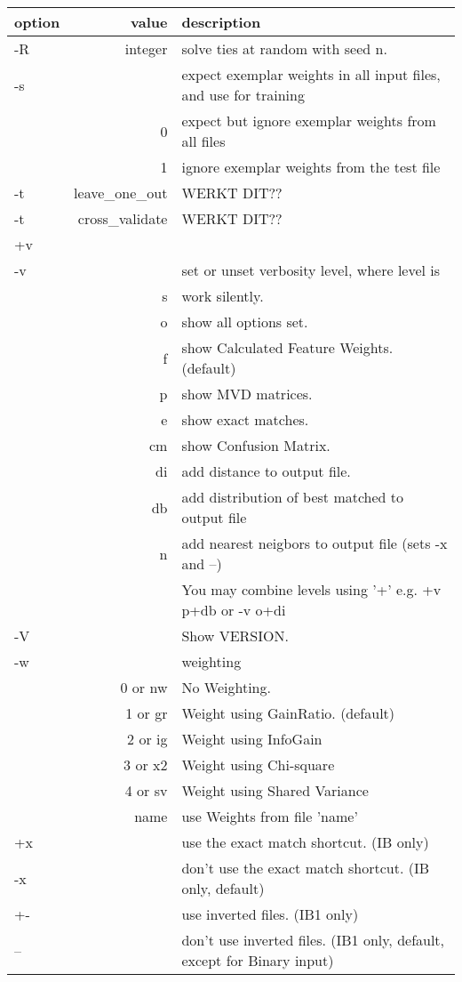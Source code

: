 \documentclass{article}
\begin{document}
\begin{tabular}{|l|r|l|}
\hline
option & value & description \\
\hline
-R & integer & solve ties at random with seed n. \\
-s &  & expect exemplar weights in all input files, and use for training \\
   & 0 & expect but ignore exemplar weights from all files \\
   & 1 & ignore exemplar weights from the test file \\
-t &  leave\_one\_out &  WERKT DIT?? \\
-t &  cross\_validate & WERKT DIT?? \\
+v && \\
-v &    & set or unset verbosity level, where level is \\
   & s  & work silently. \\
   & o  & show all options set. \\
   & f  & show Calculated Feature Weights. (default) \\
   & p  & show MVD matrices. \\
   & e  & show exact matches. \\
   & cm & show Confusion Matrix. \\
   & di & add distance to output file. \\
   & db & add distribution of best matched to output file \\
   & n  & add nearest neigbors to output file   (sets -x and --) \\
   &    &  You may combine levels using '+' e.g. +v p+db or -v o+di \\
-V & & Show VERSION. \\
-w &  & weighting \\
   & 0 or nw & No Weighting. \\
   & 1 or gr & Weight using GainRatio. (default) \\
   & 2 or ig & Weight using InfoGain \\
   & 3 or x2 & Weight using Chi-square \\
   & 4 or sv & Weight using Shared Variance \\
   & name & use Weights from file 'name' \\
+x & & use the exact match shortcut. (IB only) \\
-x & & don't use the exact match shortcut. (IB only, default) \\
+- & &  use inverted files. (IB1 only) \\
-- & &  don't use inverted files. (IB1 only, default, except for
Binary input) \\
\hline
\end{tabular}
\end{document}
